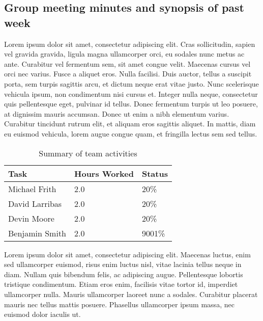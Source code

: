 \documentclass[12pt,article]{IEEEtran}
\begin{document}

	 

\subsection{Group meeting minutes and synopsis of past week}

Lorem ipsum dolor sit amet, consectetur adipiscing elit. Cras sollicitudin, sapien vel gravida gravida, ligula magna ullamcorper orci, eu sodales nunc metus ac ante. Curabitur vel fermentum sem, sit amet congue velit. Maecenas cursus vel orci nec varius. Fusce a aliquet eros. Nulla facilisi. Duis auctor, tellus a suscipit porta, sem turpis sagittis arcu, et dictum neque erat vitae justo. Nunc scelerisque vehicula ipsum, non condimentum nisi cursus et. Integer nulla neque, consectetur quis pellentesque eget, pulvinar id tellus. Donec fermentum turpis ut leo posuere, at dignissim mauris accumsan. Donec ut enim a nibh elementum varius. Curabitur tincidunt rutrum elit, et aliquam eros sagittis aliquet. In mattis, diam eu euismod vehicula, lorem augue congue quam, et fringilla lectus sem sed tellus.

\begin{table}[ht]
\renewcommand{\arraystretch}{1.3}
	\caption{Summary of team activities}
	
	\label{Summary of team activities}
	
	\centering
	\begin{tabular}{p{5.5cm}|p{1cm}|p{1cm}}
	\hline
	\bfseries 	Task		 		& \bfseries Hours Worked	& \bfseries Status	\\
	\hline
	\hline
				Michael Frith		& 2.0						& 20\%				\\	%
				David Larribas 		& 2.0						& 20\%				\\	
				Devin Moore 		& 2.0						& 20\%				\\	
				Benjamin Smith		& 2.0						& 9001\%			\\	
	\hline
	\end{tabular}
\end{table}


Lorem ipsum dolor sit amet, consectetur adipiscing elit. Maecenas luctus, enim sed ullamcorper euismod, risus enim luctus nisl, vitae lacinia tellus neque in diam. Nullam quis bibendum felis, ac adipiscing augue. Pellentesque lobortis tristique condimentum. Etiam eros enim, facilisis vitae tortor id, imperdiet ullamcorper nulla. Mauris ullamcorper laoreet nunc a sodales. Curabitur placerat mauris nec tellus mattis posuere. Phasellus ullamcorper ipsum massa, nec euismod dolor iaculis ut.
\end{document}
